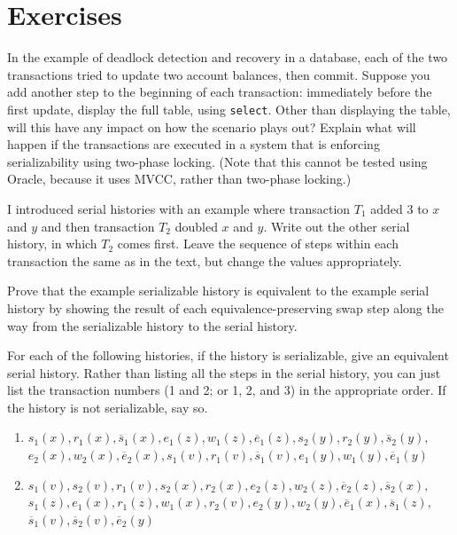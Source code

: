 \section*{Exercises}
\begin{chapterEnumerate}
\item
\label{select-first}
In the example of deadlock detection and recovery in a database, each
of the two transactions tried to update two account balances, then
commit.  Suppose you add another step to the beginning of each
transaction: immediately before the first update, display the full
table, using \verb|select|.  Other than displaying the table, will
this have any impact on how the scenario plays out? Explain what will
happen if the transactions are executed in a system that is enforcing
serializability using two-phase locking.  (Note that this cannot be
tested using Oracle, because it uses MVCC, rather than two-phase locking.)
\item\label{t2-first-ex}
I introduced serial histories with an example where transaction $T_1$
added 3 to $x$ and $y$ and then transaction $T_2$ doubled $x$ and
$y$.  Write out the other serial history, in which $T_2$ comes first.
Leave the sequence of steps within each transaction the same as in the text,
but change the values appropriately.
\item\label{serializing-ex}
Prove that the example serializable history is equivalent to the
example serial history by showing the result of each
equivalence-preserving swap step along the way from the serializable
history to the serial history.
\item\label{reads-commute-ex}
For each of the following histories, if the
history is serializable, give an equivalent serial history.  Rather
than listing all the steps in the serial history, you can just list
the transaction numbers (1 and 2; or 1, 2, and 3) in the appropriate
order. If the history is not serializable, say so.
\begin{enumerate}
\item
$s_1(x), r_1(x), \overline{s}_1(x), e_1(z), w_1(z), \overline{e}_1(z), s_2(y), r_2(y),
  \overline{s}_2(y),$\\$e_2(x), w_2(x), \overline{e}_2(x), s_1(v), r_1(v), \overline{s}_1(v), e_1(y),
  w_1(y), \overline{e}_1(y)$
\item
$s_1(v),s_2(v),r_1(v), s_2(x), r_2(x), e_2(z), w_2(z), \overline{e}_2(z),\overline{s}_2(x),$\\$
  s_1(z), e_1(x), r_1(z), w_1(x), r_2(v), e_2(y),
  w_2(y),\overline{e}_1(x),\overline{s}_1(z),$\\$\overline{s}_1(v),\overline{s}_2(v),\overline{e}_2(y)$

\end{enumerate}
\end{chapterEnumerate}
